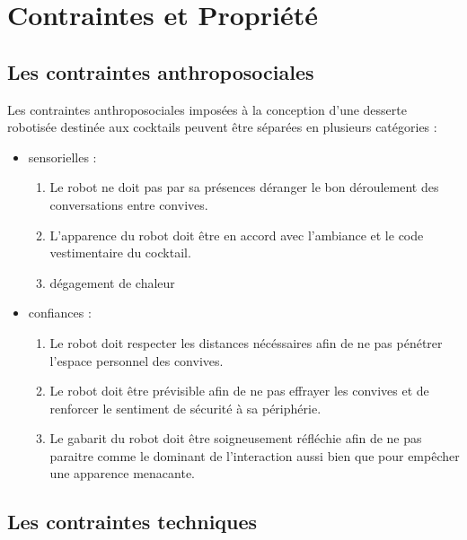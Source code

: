 \chapter{Contraintes et Propriété}

\section{Les contraintes anthroposociales}

Les contraintes anthroposociales imposées à la conception d'une desserte robotisée destinée aux cocktails peuvent être séparées en plusieurs catégories :
\begin{itemize}
\item sensorielles :
  \begin{enumerate}
  \item Le robot ne doit pas par sa présences déranger le bon déroulement des conversations entre convives.
  \item L'apparence du robot doit être en accord avec l'ambiance et le code vestimentaire du cocktail.
  \item dégagement de chaleur
  \end{enumerate}
\item confiances :
  \begin{enumerate}
  \item Le robot doit respecter les distances nécéssaires afin de ne pas pénétrer l'espace personnel des convives.
  \item Le robot doit être prévisible afin de ne pas effrayer les convives et de renforcer le sentiment de sécurité à sa périphérie.
  \item Le gabarit du robot doit être soigneusement réfléchie afin de ne pas paraitre comme le dominant de l'interaction aussi bien que pour empêcher une apparence menacante.
  \end{enumerate}
\end{itemize}




\section{Les contraintes techniques}

